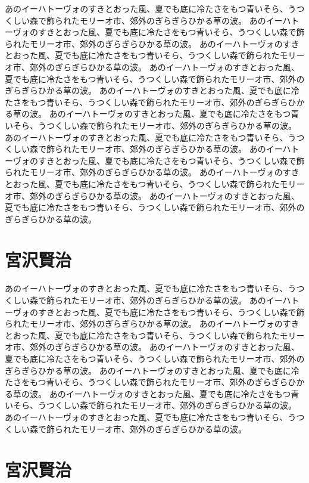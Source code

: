 \documentclass[b5j,12pt]{ltjsbook}
\begin{document}
あのイーハトーヴォのすきとおった風、夏でも底に冷たさをもつ青いそら、うつくしい森で飾られたモリーオ市、郊外のぎらぎらひかる草の波。
あのイーハトーヴォのすきとおった風、夏でも底に冷たさをもつ青いそら、うつくしい森で飾られたモリーオ市、郊外のぎらぎらひかる草の波。
あのイーハトーヴォのすきとおった風、夏でも底に冷たさをもつ青いそら、うつくしい森で飾られたモリーオ市、郊外のぎらぎらひかる草の波。
あのイーハトーヴォのすきとおった風、夏でも底に冷たさをもつ青いそら、うつくしい森で飾られたモリーオ市、郊外のぎらぎらひかる草の波。
あのイーハトーヴォのすきとおった風、夏でも底に冷たさをもつ青いそら、うつくしい森で飾られたモリーオ市、郊外のぎらぎらひかる草の波。
あのイーハトーヴォのすきとおった風、夏でも底に冷たさをもつ青いそら、うつくしい森で飾られたモリーオ市、郊外のぎらぎらひかる草の波。
あのイーハトーヴォのすきとおった風、夏でも底に冷たさをもつ青いそら、うつくしい森で飾られたモリーオ市、郊外のぎらぎらひかる草の波。
あのイーハトーヴォのすきとおった風、夏でも底に冷たさをもつ青いそら、うつくしい森で飾られたモリーオ市、郊外のぎらぎらひかる草の波。
あのイーハトーヴォのすきとおった風、夏でも底に冷たさをもつ青いそら、うつくしい森で飾られたモリーオ市、郊外のぎらぎらひかる草の波。
あのイーハトーヴォのすきとおった風、夏でも底に冷たさをもつ青いそら、うつくしい森で飾られたモリーオ市、郊外のぎらぎらひかる草の波。

\section{宮沢賢治}

あのイーハトーヴォのすきとおった風、夏でも底に冷たさをもつ青いそら、うつくしい森で飾られたモリーオ市、郊外のぎらぎらひかる草の波。
あのイーハトーヴォのすきとおった風、夏でも底に冷たさをもつ青いそら、うつくしい森で飾られたモリーオ市、郊外のぎらぎらひかる草の波。
あのイーハトーヴォのすきとおった風、夏でも底に冷たさをもつ青いそら、うつくしい森で飾られたモリーオ市、郊外のぎらぎらひかる草の波。
あのイーハトーヴォのすきとおった風、夏でも底に冷たさをもつ青いそら、うつくしい森で飾られたモリーオ市、郊外のぎらぎらひかる草の波。
あのイーハトーヴォのすきとおった風、夏でも底に冷たさをもつ青いそら、うつくしい森で飾られたモリーオ市、郊外のぎらぎらひかる草の波。
あのイーハトーヴォのすきとおった風、夏でも底に冷たさをもつ青いそら、うつくしい森で飾られたモリーオ市、郊外のぎらぎらひかる草の波。
あのイーハトーヴォのすきとおった風、夏でも底に冷たさをもつ青いそら、うつくしい森で飾られたモリーオ市、郊外のぎらぎらひかる草の波。

\section{宮沢賢治}
\end{document}
